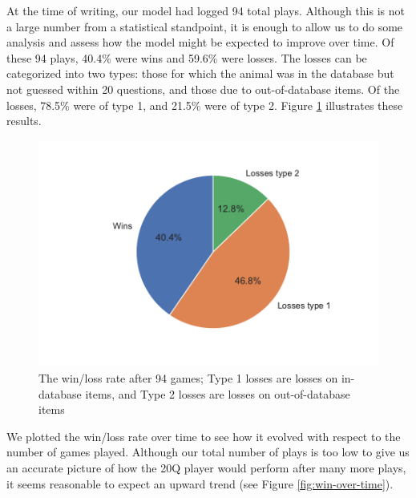 \documentclass[11pt,a4paper]{article}
\begin{document}
At the time of writing, our model had logged 94 total plays. Although this is not a large number from a statistical standpoint, it is enough to allow us to do some analysis and assess how the model might be expected to improve over time. Of these 94 plays, 40.4\% were wins and 59.6\% were losses. The losses can be categorized into two types: those for which the animal was in the database but not guessed within 20 questions, and those due to out-of-database items. Of the losses, 78.5\% were of type 1, and 21.5\% were of type 2. 
Figure \ref{fig:wins-losses} illustrates these results. 

\begin{figure}
    \centering
    \includegraphics[width=\linewidth]{graphics/pie_detailed-winsLosses.pdf}
    \caption{The win/loss rate after 94 games; Type 1 losses are losses on in-database items, and Type 2 losses are losses on out-of-database items}
    \label{fig:wins-losses}
\end{figure}

We plotted the win/loss rate over time to see how it evolved with respect to the number of games played. Although our total number of plays is too low to give us an accurate picture of how the 20Q player would perform after many more plays, it seems reasonable to expect an upward trend (see Figure \ref{fig:win-over-time}).
\end{document}

